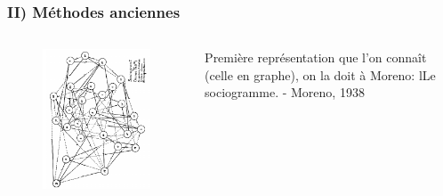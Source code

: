 \documentclass{beamer}
\begin{document}
\begin{frame}
    \frametitle{II) Méthodes anciennes}
    \begin{columns}
        \begin{column}{0.5\textwidth}
            \begin{figure}
                \centering
                \includegraphics[width = \textwidth]{moreno_sociogramme.png}
            \end{figure}
        \end{column}
        \begin{column}{0.5\textwidth}
            Première représentation que l'on connaît (celle en graphe), on la doit à Moreno: lLe sociogramme. - Moreno, 1938
        \end{column}
    \end{columns}
\end{frame}
\end{document}
